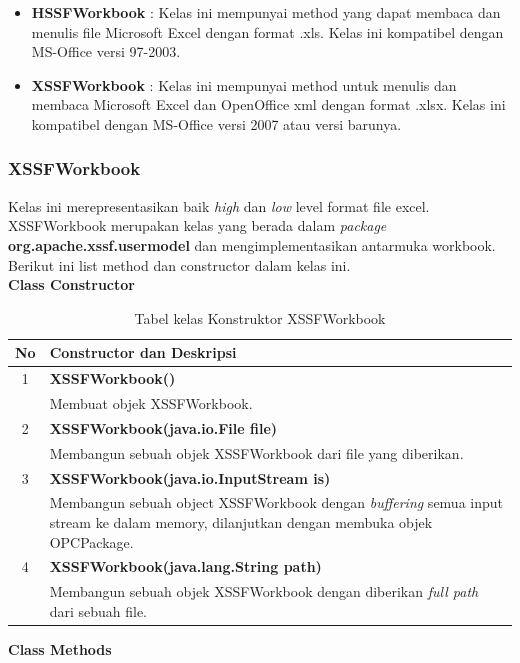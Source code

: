 \begin{itemize}
	\item \textbf{HSSFWorkbook} : Kelas ini mempunyai method yang dapat membaca dan menulis file Microsoft Excel dengan format .xls. Kelas ini kompatibel dengan MS-Office versi 97-2003.
	\item \textbf{XSSFWorkbook} : Kelas ini mempunyai method untuk menulis dan membaca Microsoft Excel dan OpenOffice xml dengan format .xlsx. Kelas ini kompatibel dengan MS-Office versi 2007 atau versi barunya.
\end{itemize}  

\subsubsection{XSSFWorkbook}
\label{subs:XSSFWorkbook}
Kelas ini merepresentasikan baik \textit{high} dan \textit{low} level format file excel. XSSFWorkbook merupakan kelas yang berada dalam \textit{package} \textbf{org.apache.xssf.usermodel} dan mengimplementasikan antarmuka workbook. Berikut ini list method dan constructor dalam kelas ini.\cite{apachepoi2}
\\
\noindent \textbf{Class Constructor}
\begin{table}[H]
		\centering
		\caption{Tabel kelas Konstruktor XSSFWorkbook}
		\label{tab:konstrukXSSF}
	\begin{tabular}{|c|p{12cm}|}
		\hline
		\textbf{No} & \textbf{Constructor dan Deskripsi} \\ \hline \hline
		1 & \textbf{XSSFWorkbook()}\\
			&	Membuat objek XSSFWorkbook.\\ \hline 
		2 & \textbf{XSSFWorkbook(java.io.File file)}\\
			&	Membangun sebuah objek XSSFWorkbook dari file yang diberikan.\\ \hline
		3 & \textbf{XSSFWorkbook(java.io.InputStream is)}\\
			&	Membangun sebuah object XSSFWorkbook dengan \textit{buffering} semua input stream ke dalam memory, dilanjutkan dengan membuka objek OPCPackage.\\ \hline 
		4 & \textbf{XSSFWorkbook(java.lang.String path)}\\
			&	Membangun sebuah objek XSSFWorkbook dengan diberikan \textit{full path} dari sebuah file.\\ \hline
	\end{tabular}
\end{table}

\noindent \textbf{Class Methods}

